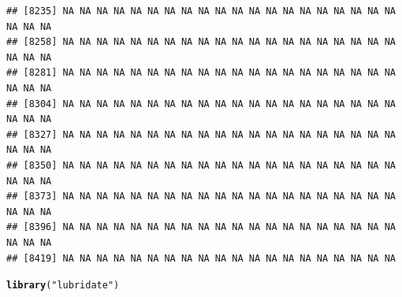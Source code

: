 \documentclass{article}\usepackage[]{graphicx}\usepackage[]{color}
\makeatletter
\newcommand{\hlstr}[1]{\textcolor[rgb]{0.192,0.494,0.8}{#1}}%
\newcommand{\hlstd}[1]{\textcolor[rgb]{0.345,0.345,0.345}{#1}}%
\newcommand{\hlkwd}[1]{\textcolor[rgb]{0.737,0.353,0.396}{\textbf{#1}}}%
\newenvironment{kframe}{%
 \def\at@end@of@kframe{}%
 \ifinner\ifhmode%
  \def\at@end@of@kframe{\end{minipage}}%
  \begin{minipage}{\columnwidth}%
 \fi\fi%
 \def\FrameCommand##1{\hskip\@totalleftmargin \hskip-\fboxsep
 \colorbox{shadecolor}{##1}\hskip-\fboxsep
     \hskip-\linewidth \hskip-\@totalleftmargin \hskip\columnwidth}%
 \MakeFramed {\advance\hsize-\width
   \@totalleftmargin\z@ \linewidth\hsize
   \@setminipage}}%
 {\par\unskip\endMakeFramed%
 \at@end@of@kframe}
\newenvironment{knitrout}{}{} %
\makeatother
\begin{document}
\begin{knitrout}
\begin{kframe}
\begin{verbatim}
## [8235] NA NA NA NA NA NA NA NA NA NA NA NA NA NA NA NA NA NA NA NA NA NA NA
## [8258] NA NA NA NA NA NA NA NA NA NA NA NA NA NA NA NA NA NA NA NA NA NA NA
## [8281] NA NA NA NA NA NA NA NA NA NA NA NA NA NA NA NA NA NA NA NA NA NA NA
## [8304] NA NA NA NA NA NA NA NA NA NA NA NA NA NA NA NA NA NA NA NA NA NA NA
## [8327] NA NA NA NA NA NA NA NA NA NA NA NA NA NA NA NA NA NA NA NA NA NA NA
## [8350] NA NA NA NA NA NA NA NA NA NA NA NA NA NA NA NA NA NA NA NA NA NA NA
## [8373] NA NA NA NA NA NA NA NA NA NA NA NA NA NA NA NA NA NA NA NA NA NA NA
## [8396] NA NA NA NA NA NA NA NA NA NA NA NA NA NA NA NA NA NA NA NA NA NA NA
## [8419] NA NA NA NA NA NA NA NA NA NA NA NA NA NA NA NA NA NA NA NA
\end{verbatim}
\begin{alltt}
\hlkwd{library}\hlstd{(}\hlstr{"lubridate"}\hlstd{)}
\end{alltt}


{\ttfamily\noindent\itshape\color{messagecolor}{\#\# \\\#\# Attaching package: 'lubridate'}}


\end{kframe}
\end{knitrout}
\end{document}
